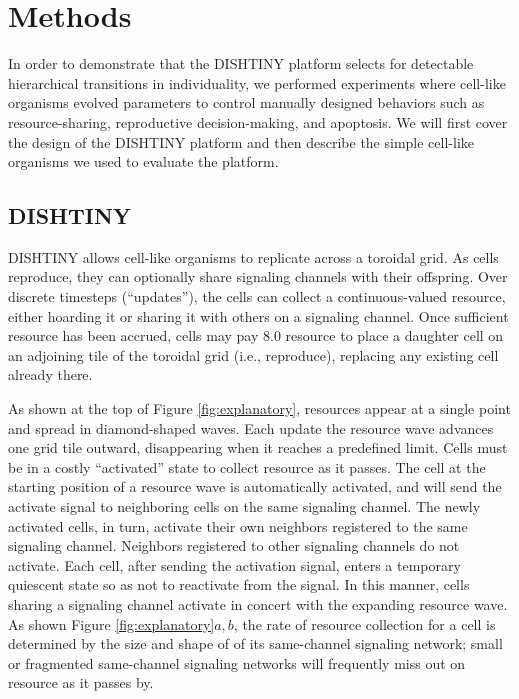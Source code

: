 \section{Methods}

In order to demonstrate that the DISHTINY platform selects for detectable hierarchical transitions in individuality, we performed experiments where cell-like organisms evolved parameters to control manually designed behaviors such as resource-sharing, reproductive decision-making, and apoptosis.
We will first cover the design of the DISHTINY platform and then describe the simple cell-like organisms we used to evaluate the platform.

\subsection{DISHTINY}



DISHTINY allows cell-like organisms to replicate across a toroidal grid.  As cells reproduce, they can optionally share signaling channels with their offspring.
Over discrete timesteps (``updates''), the cells can collect a continuous-valued resource, either hoarding it or sharing it with others on a signaling channel.
Once sufficient resource has been accrued, cells may pay $8.0$ resource to place a daughter cell on an adjoining tile of the toroidal grid (i.e., reproduce), replacing any existing cell already there.

As shown at the top of Figure \ref{fig:explanatory}, resources appear at a single point and spread in diamond-shaped waves.
Each update the resource wave advances one grid tile outward, disappearing when it reaches a predefined limit.
Cells must be in a costly ``activated'' state to collect resource as it passes.
The cell at the starting position of a resource wave is automatically activated, and will send the activate signal to neighboring cells on the same signaling channel.
The newly activated cells, in turn, activate their own neighbors registered to the same signaling channel.
Neighbors registered to other signaling channels do not activate.
Each cell, after sending the activation signal, enters a temporary quiescent state so as not to reactivate from the signal.
In this manner, cells sharing a signaling channel activate in concert with the expanding resource wave.
As shown Figure \ref{fig:explanatory}$a,b$, the rate of resource collection for a cell is determined by the size and shape of of its same-channel signaling network;
small or fragmented same-channel signaling networks will frequently miss out on resource as it passes by.


